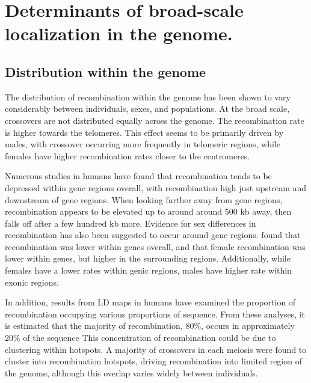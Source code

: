 \section{Determinants of broad-scale localization in the genome.}

\subsection{Distribution within the genome}

The distribution of recombination within the genome has been shown to vary considerably between individuals, sexes, and populations.
At the broad scale, crossovers are not distributed equally across the genome.
The recombination rate is higher towards the telomeres\cite{Broman1998,Mcvean2004,hapmap2007}.
This effect seems to be primarily driven by males, with crossover occurring more frequently in telomeric regions, while females have higher recombination rates closer to the centromeres\cite{Kong2002,Coop2008,Kong2010}.

Numerous studies in humans have found that recombination tends to be depressed within gene regions overall, with recombination high just upstream and downstream of gene regions\cite{Mcvean2004,Myers2005,hapmap2007,Spencer2006,Kong2010}.
When looking further away from gene regions, recombination appears to be elevated up to around around 500 kb away, then falls off after a few hundred kb more.
Evidence for sex differences in recombination has also been suggested to occur around gene regions.
\citet{Kong2010} found that recombination was lower within genes overall, and that
female recombination was lower within genes, but higher in the surrounding regions.
Additionally, while females have a lower rates within genic regions, males have higher rate within exonic regions\cite{Kong2010}.

In addition, results from LD maps in humans have examined the proportion of recombination occupying various proportions of sequence.
From these analyses, it is estimated that the majority of recombination, 80\%, occurs in approximately 20\% of the sequence\cite{Mcvean2004,Myers2005,hapmap2007}
This concentration of recombination could be due to clustering within hotspots.
A majority of crossovers in each meiosis were found to cluster into recombination hotspots, driving recombination into limited region of the genome\cite{Coop2008}, although this overlap varies widely between individuals.


